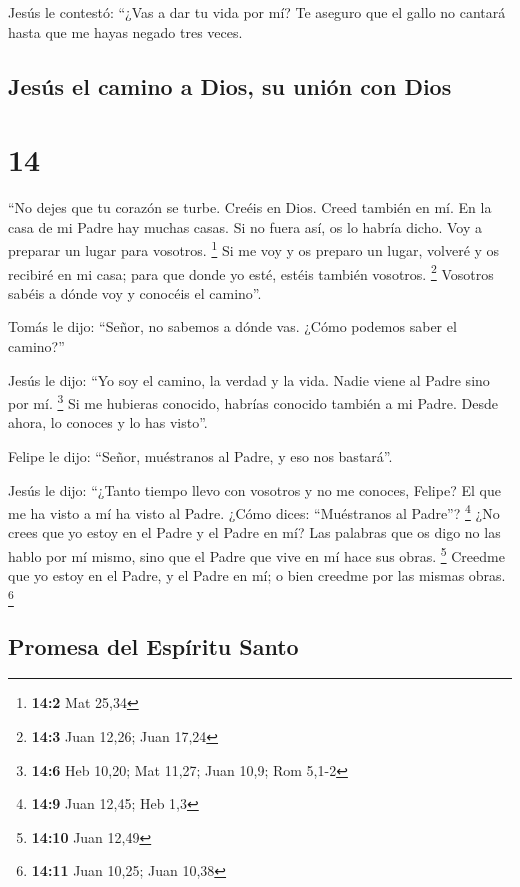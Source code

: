  Jesús le contestó: ``¿Vas a dar tu vida por mí? Te
aseguro que el gallo no cantará hasta que me hayas negado tres veces.

\hypertarget{jesuxfas-el-camino-a-dios-su-uniuxf3n-con-dios}{%
\subsection{Jesús el camino a Dios, su unión con
Dios}\label{jesuxfas-el-camino-a-dios-su-uniuxf3n-con-dios}}

\hypertarget{section-13}{%
\section{14}\label{section-13}}

 ``No dejes que tu corazón se turbe. Creéis en Dios. Creed
también en mí.  En la casa de mi Padre hay muchas casas.
Si no fuera así, os lo habría dicho. Voy a preparar un lugar para
vosotros. \footnote{\textbf{14:2} Mat 25,34}  Si me voy y
os preparo un lugar, volveré y os recibiré en mi casa; para que donde yo
esté, estéis también vosotros. \footnote{\textbf{14:3} Juan 12,26; Juan
  17,24}  Vosotros sabéis a dónde voy y conocéis el
camino''.

 Tomás le dijo: ``Señor, no sabemos a dónde vas. ¿Cómo
podemos saber el camino?''

 Jesús le dijo: ``Yo soy el camino, la verdad y la vida.
Nadie viene al Padre sino por mí. \footnote{\textbf{14:6} Heb 10,20; Mat
  11,27; Juan 10,9; Rom 5,1-2}  Si me hubieras conocido,
habrías conocido también a mi Padre. Desde ahora, lo conoces y lo has
visto''.

 Felipe le dijo: ``Señor, muéstranos al Padre, y eso nos
bastará''.

 Jesús le dijo: ``¿Tanto tiempo llevo con vosotros y no me
conoces, Felipe? El que me ha visto a mí ha visto al Padre. ¿Cómo dices:
``Muéstranos al Padre''? \footnote{\textbf{14:9} Juan 12,45; Heb 1,3}
 ¿No crees que yo estoy en el Padre y el Padre en mí? Las
palabras que os digo no las hablo por mí mismo, sino que el Padre que
vive en mí hace sus obras. \footnote{\textbf{14:10} Juan 12,49}
 Creedme que yo estoy en el Padre, y el Padre en mí; o
bien creedme por las mismas obras. \footnote{\textbf{14:11} Juan 10,25;
  Juan 10,38}

\hypertarget{promesa-del-espuxedritu-santo}{%
\subsection{Promesa del Espíritu
Santo}\label{promesa-del-espuxedritu-santo}}

